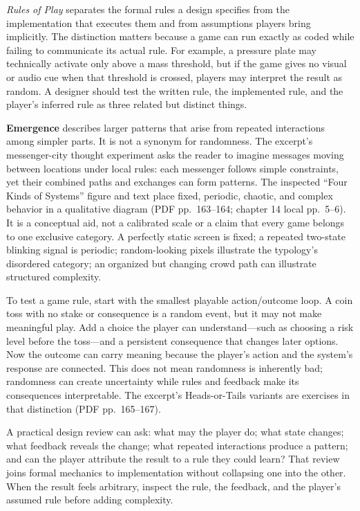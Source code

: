 \hypertarget{05-engine-i-ch009-rules-emergence-and-meaningful-outcomes}{}

\emph{Rules of Play} separates the formal rules a design specifies from the implementation that executes them and from assumptions players bring implicitly. The distinction matters because a game can run exactly as coded while failing to communicate its actual rule. For example, a pressure plate may technically activate only above a mass threshold, but if the game gives no visual or audio cue when that threshold is crossed, players may interpret the result as random. A designer should test the written rule, the implemented rule, and the player's inferred rule as three related but distinct things.

\textbf{Emergence} describes larger patterns that arise from repeated interactions among simpler parts. It is not a synonym for randomness. The excerpt's messenger-city thought experiment asks the reader to imagine messages moving between locations under local rules: each messenger follows simple constraints, yet their combined paths and exchanges can form patterns. The inspected ``Four Kinds of Systems'' figure and text place fixed, periodic, chaotic, and complex behavior in a qualitative diagram (PDF pp.~163--164; chapter 14 local pp.~5--6). It is a conceptual aid, not a calibrated scale or a claim that every game belongs to one exclusive category. A perfectly static screen is fixed; a repeated two-state blinking signal is periodic; random-looking pixels illustrate the typology's disordered category; an organized but changing crowd path can illustrate structured complexity.

To test a game rule, start with the smallest playable action/outcome loop. A coin toss with no stake or consequence is a random event, but it may not make meaningful play. Add a choice the player can understand---such as choosing a risk level before the toss---and a persistent consequence that changes later options. Now the outcome can carry meaning because the player's action and the system's response are connected. This does not mean randomness is inherently bad; randomness can create uncertainty while rules and feedback make its consequences interpretable. The excerpt's Heads-or-Tails variants are exercises in that distinction (PDF pp.~165--167).

A practical design review can ask: what may the player do; what state changes; what feedback reveals the change; what repeated interactions produce a pattern; and can the player attribute the result to a rule they could learn? That review joins formal mechanics to implementation without collapsing one into the other. When the result feels arbitrary, inspect the rule, the feedback, and the player's assumed rule before adding complexity.

